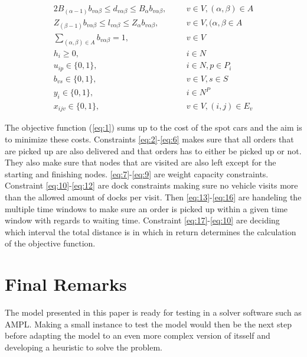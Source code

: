 \documentclass[a4paper,10pt]{article}
\begin{document}
\begin{alignat} {2}
	B_{(\alpha-1)}b_{v\alpha\beta} \leq d_{v\alpha\beta} \leq 
	B_\alpha b_{v\alpha\beta},						& 	&&	v \in V, (\alpha, \beta) \in A			\label{eq:19}	\\[8pt]
 	Z_{(\beta-1)}b_{v\alpha\beta} \leq l_{v\alpha\beta} \leq 
	Z_\alpha b_{v\alpha\beta},						& 	&&	v \in V, (\alpha, \beta \in A 			\label{eq:19}	\\[8pt]   	
	\sum_{(\alpha, \beta) \in A} b_{v\alpha\beta} = 1,			& 	&&	v \in V						\label{eq:20}	\\[4pt]
    	h_{i} \geq 0,								& 	&&	i \in N 					\label{eq:21}	\\[8pt]
    	u_{ip} \in \{0, 1\},							& 	&&	i \in N, p \in P_i 				\label{eq:22}	\\[8pt]
    	b_{vs} \in \{0, 1\},							& 	&&	v \in V, s \in S 				\label{eq:23}	\\[8pt]
    	y_i \in \{0, 1\},							& 	&&	i \in N^P 					\label{eq:24}	\\[8pt]
    	x_{ijv} \in \{0, 1\},							&	&&	v \in V, (i, j) \in E_v 			\label{eq:25}
\end{alignat} 
\endgroup

\par
The objective function (\ref{eq:1}) sums up to the cost of the spot cars and the aim is to minimize these costs. 
Constraints \ref{eq:2}-\ref{eq:6} makes sure that all orders that are picked up are also delivered and that orders has to either be picked up or not. They also make sure that nodes that are visited are also left except for the starting and finishing nodes.
\ref{eq:7}-\ref{eq:9} are weight capacity constraints.
Constraint \ref{eq:10}-\ref{eq:12} are dock constraints making sure no vehicle visits more than the allowed amount of docks per visit.
Then \ref{eq:13}-\ref{eq:16} are handeling the multiple time windows to make sure an order is picked up within a given time window with regards to waiting time.
Constraint \ref{eq:17}-\ref{eq:10} are deciding which interval the total distance is in which in return determines the calculation of the objective function. \newline

\section{Final Remarks}
The model presented in this paper is ready for testing in a solver software such as AMPL. Making a small instance to test the model would then be the next step before adapting the model to an even more complex version of itsself and developing a heuristic to solve the problem. 




\end{document}
